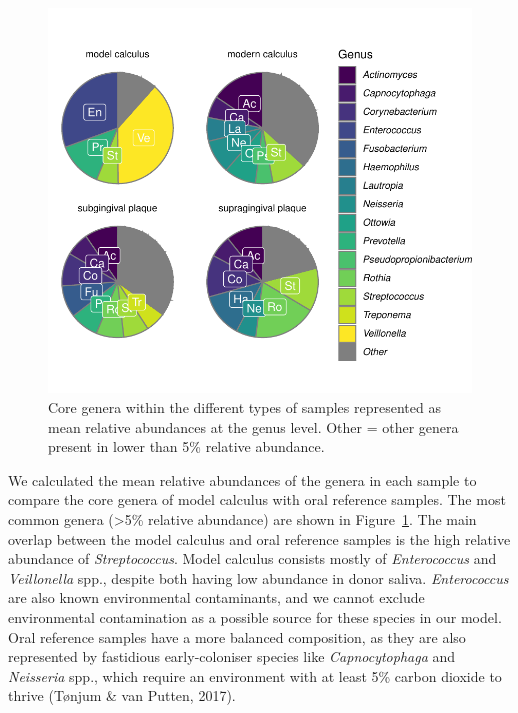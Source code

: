 \documentclass[
]{article}
\begin{document}
\begin{figure}

{\centering \includegraphics{index_files/figure-pdf/fig-core-genera-1.pdf}

}

\caption{\label{fig-core-genera}Core genera within the different types
of samples represented as mean relative abundances at the genus level.
Other = other genera present in lower than 5\% relative abundance.}

\end{figure}

We calculated the mean relative abundances of the genera in each sample
to compare the core genera of model calculus with oral reference
samples. The most common genera (\textgreater5\% relative abundance) are
shown in Figure~\ref{fig-core-genera}. The main overlap between the
model calculus and oral reference samples is the high relative abundance
of \emph{Streptococcus}. Model calculus consists mostly of
\emph{Enterococcus} and \emph{Veillonella} spp., despite both having low
abundance in donor saliva. \emph{Enterococcus} are also known
environmental contaminants, and we cannot exclude environmental
contamination as a possible source for these species in our model. Oral
reference samples have a more balanced composition, as they are also
represented by fastidious early-coloniser species like
\emph{Capnocytophaga} and \emph{Neisseria} spp., which require an
environment with at least 5\% carbon dioxide to thrive (Tønjum \& van
Putten, 2017).
\end{document}
